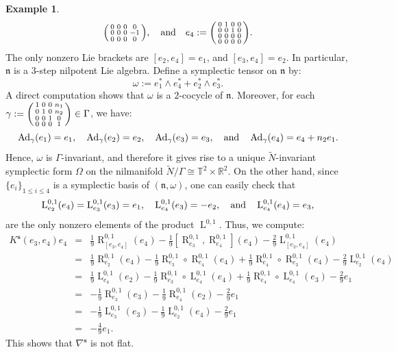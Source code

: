 \documentclass[preprint,12pt,1p]{elsarticle}
\theoremstyle{plain}
\theoremstyle{definition}
\newtheorem{example}[theorem]{Example}
\newcommand{\ro}{\circ}
\newcommand{\rel}{\mathbb{R}}
\newcommand{\n}{\nabla}
\newcommand{\w}{\omega}
\newcommand{\et}{\quad \textnormal{and}\quad}
\newcommand{\Ad}{\operatorname{Ad}}
\newcommand{\la}{\operatorname{L}^{0,1}}
\newcommand{\ra}{\operatorname{R}^{0,1}}
\numberwithin{equation}{section}
\newcommand{\nl}{\mathfrak{n}}
\begin{document}
\begin{example}
\begin{equation*}
\begin{psmallmatrix}
0&0&0&0\\
0&0&0&-1\\
0&0&0&0\\
\end{psmallmatrix},\et e_4:=\begin{psmallmatrix}
0&1&0&0\\
0&0&1&0\\
0&0&0&0\\
0&0&0&0\\
\end{psmallmatrix}.
\end{equation*}
The only nonzero Lie brackets are $[e_2,e_4]=e_1$, and $[e_3,e_4]=e_2$. In particular, $\nl$ is a $3$-step nilpotent Lie algebra. Define a symplectic tensor on $\nl$ by:
\begin{equation*}
\w:=e^*_1\wedge e^*_4+e^*_2\wedge e^*_3.
\end{equation*}
A direct computation shows that $\w$ is a $2$-cocycle of $\nl$. Moreover, for each $\gamma:=\begin{psmallmatrix}
1&0&0&n_1\\
0&1&0&n_2\\
0&0&1&0\\
0&0&0&1\\
\end{psmallmatrix}\in\Gamma$, we have:
\begin{equation*}
\Ad_\gamma(e_1)=e_1,\quad\Ad_\gamma(e_2)=e_2,\quad\Ad_\gamma(e_3)=e_3,\et\Ad_\gamma(e_4)=e_4+n_2e_1.
\end{equation*}
Hence, $\w$ is $\Gamma$-invariant, and therefore it gives rise to a unique $\widetilde{N}$-invariant symplectic form $\Omega$ on the nilmanifold $\widetilde{N}/\Gamma\cong\mathbb{T}^2\times\rel^2$. On the other hand, since $\{e_i\}_{1\leqslant i\leqslant 4}$ is a symplectic basis of $(\nl,\w)$, one can easily check that 
\begin{equation*}
\la_{e_2}(e_4)=\la_{e_3}(e_3)=e_1,\quad \la_{e_4}(e_3)=-e_2,\et\la_{e_4}(e_4)=e_3,
\end{equation*}
are the only nonzero elements of the product $\la$. Thus, we compute:  
\begin{eqnarray*}
K^\mathbf{s}(e_3,e_4)e_4&=&\tfrac{1}{9}\ra_{[e_3,e_4]}(e_4)-\tfrac{1}{9}\left[\ra_{e_3},\ra_{e_4}\right](e_4)-\tfrac{2}{9}\la_{[e_3,e_4]}(e_4)\\
&=&\tfrac{1}{9}\ra_{e_2}(e_4)-\tfrac{1}{9}\ra_{e_3}\ro\ra_{e_4}(e_4)+\tfrac{1}{9}\ra_{e_4}\ro\ra_{e_3}(e_4)-\tfrac{2}{9}\la_{e_2}(e_4)\\
&=&\tfrac{1}{9}\la_{e_4}(e_2)-\tfrac{1}{9}\ra_{e_3}\ro\la_{e_4}(e_4)+\tfrac{1}{9}\ra_{e_4}\ro\la_{e_4}(e_3)-\tfrac{2}{9}e_1\\
&=&-\tfrac{1}{9}\ra_{e_3}(e_3)-\tfrac{1}{9}\ra_{e_4}(e_2)-\tfrac{2}{9}e_1\\
&=&-\tfrac{1}{9}\la_{e_3}(e_3)-\tfrac{1}{9}\la_{e_2}(e_4)-\tfrac{2}{9}e_1\\
&=&-\tfrac{4}{9}e_1.
\end{eqnarray*}
This shows that $\n^\mathbf{s}$ is not flat.
\end{example}
\end{document}
